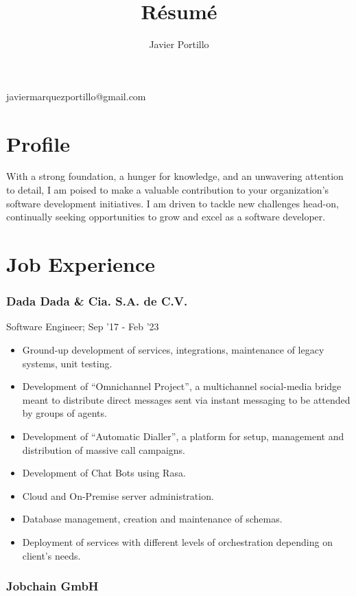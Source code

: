 \documentclass[letterpaper]{article}
\makeatletter
\renewcommand{\maketitle}{
	\begin{center}
		{\huge\bfseries\theauthor}

		\vspace{.5em}

		javiermarquezportillo@gmail.com
	\end{center}
}
\makeatother
\begin{document}
\title{R\'esum\'e}
\author{Javier Portillo}

\maketitle

\section{Profile}

With a strong foundation, a hunger for knowledge, and an unwavering attention to detail, I am poised to make a valuable contribution to your organization's software development initiatives. I am driven to tackle new challenges head-on, continually seeking opportunities to grow and excel as a software developer.

\section{Job Experience}

\subsubsection{Dada Dada \& Cia. S.A. de C.V.}

Software Engineer; Sep '17 - Feb '23

\begin{itemize}
  \item Ground-up development of services, integrations, maintenance of legacy systems, unit testing.
  \item Development of ``Omnichannel Project'', a multichannel social-media bridge meant to distribute direct messages sent via instant messaging to be attended by groups of agents.
  \item Development of ``Automatic Dialler'', a platform for setup, management and distribution of massive call campaigns.
  \item Development of Chat Bots using Rasa.
  \item Cloud and On-Premise server administration.
  \item Database management, creation and maintenance of schemas.
  \item Deployment of services with different levels of orchestration depending on client's needs.
\end{itemize}

\subsubsection{Jobchain GmbH}
\end{document}
